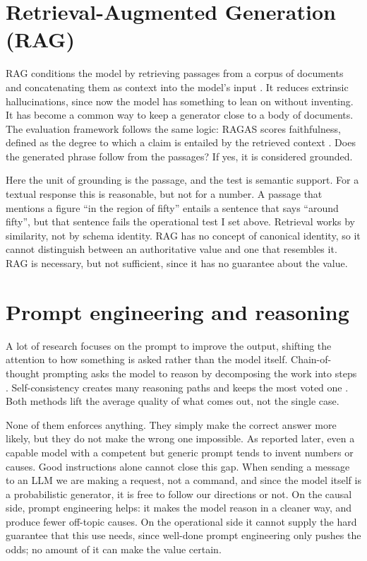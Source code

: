 \documentclass[12pt,a4paper,openright,twoside]{book}
\begin{document}
\section{Retrieval-Augmented Generation (RAG)}
\ac{RAG} conditions the model by retrieving passages from a corpus of documents and concatenating them as context into the model's input \cite{lewis2020rag}.
It reduces extrinsic hallucinations, since now the model has something to lean on without inventing. It has become a common way to keep a generator close to a body of documents.
The evaluation framework follows the same logic: RAGAS scores faithfulness, defined as the degree to which a claim is entailed by the retrieved context \cite{es2023ragas}.
Does the generated phrase follow from the passages? If yes, it is considered grounded.

Here the unit of grounding is the passage, and the test is semantic support.
For a textual response this is reasonable, but not for a number. 
A passage that mentions a figure \enquote{in the region of fifty} entails a sentence that says \enquote{around fifty}, but that sentence fails the operational test I set above.
Retrieval works by similarity, not by schema identity. \ac{RAG} has no concept of canonical identity, so it cannot distinguish between an authoritative value and one that resembles it.
\ac{RAG} is necessary, but not sufficient, since it has no guarantee about the value.


\section{Prompt engineering and reasoning}
\label{sec:prompt_engineering}
A lot of research focuses on the prompt to improve the output, shifting the attention to how something is asked rather than the model itself.
Chain-of-thought prompting asks the model to reason by decomposing the work into steps \cite{wei2022cot}.
Self-consistency creates many reasoning paths and keeps the most voted one \cite{wang2023selfconsistency}.
Both methods lift the average quality of what comes out, not the single case.

None of them enforces anything. 
They simply make the correct answer more likely, but they do not make the wrong one impossible.
As reported later, even a capable model with a competent but generic prompt tends to invent numbers or causes. 
Good instructions alone cannot close this gap.
When sending a message to an \ac{LLM} we are making a request, not a command, and since the model itself is a probabilistic generator, it is free to follow our directions or not.
On the causal side, prompt engineering helps: it makes the model reason in a cleaner way, and produce fewer off-topic causes.
On the operational side it cannot supply the hard guarantee that this use needs, since well-done prompt engineering only pushes the odds; no amount of it can make the value certain.
\end{document}
